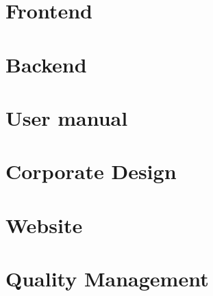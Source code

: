 

\section{Frontend}
%











\section{Backend}
%







\section{User manual}

\section{Corporate Design}
%
\section{Website}
%

\section{Quality Management}
\def\kapitelautor{Julian Lorenz}
